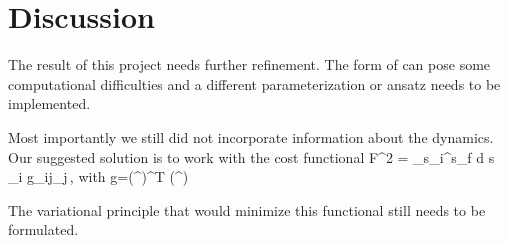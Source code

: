 \section{Discussion}
\label{sec:sum}

The result of this project needs further refinement. The form of 
can pose some computational difficulties and a different parameterization or
ansatz needs to be implemented.

Most importantly we still did not incorporate information about the dynamics. Our
suggested solution is to work with the cost functional
\beq
  	F^2 = \int_{s_i}^{s_f} d s\,  _i g_{ij}_j\,,
\eeq
with
\beq
	g=\left(\JL {}^{\perp}\right)^T  \left(\JL {}^{\perp}\right)
\eeq

The variational principle that would minimize this functional still needs to be 
formulated. 








% 
